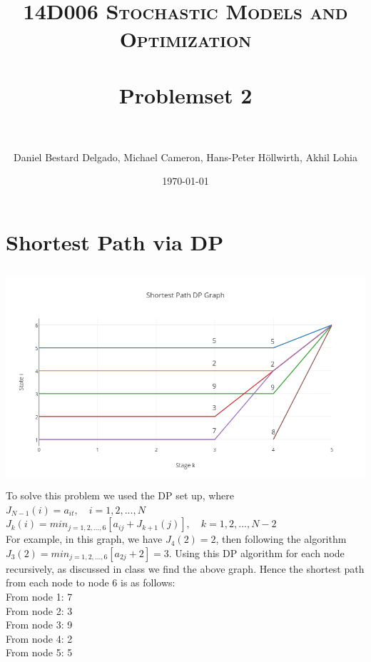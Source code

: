 \documentclass[11pt, oneside]{article}   	%
\title{	
\normalfont \normalsize 
\textsc{14D006 Stochastic Models and Optimization} \\ [25pt] %
\horrule{0.5pt} \\[0.4cm] %
\huge Problemset 2\\ %
\horrule{2pt} \\[0.5cm] %
}
\author{Daniel Bestard Delgado, Michael Cameron, Hans-Peter H{\"o}llwirth, Akhil Lohia} %
\date{\normalsize\today} %
\begin{document}
\maketitle


\section{Shortest Path via DP}


\includegraphics[width=14cm, height=8cm]{Plot2.png} \\
To solve this problem we used the DP set up, where \\
$J_{N-1}(i) = a_{it}, \quad i=1,2,...,N$ \\
$J_{k}(i) = min_{j=1,2,...,6}[a_{ij}+J_{k+1}(j)], \quad k=1,2,...,N-2$  \\

\noindent For example, in this graph, we have $J_{4}(2) = 2$, then following the algorithm \\ $J_{3}(2) = min_{j=1,2,...,6}[a_{2j}+2]=3$. Using this DP algorithm for each node recursively, as discussed in class we find the above graph. Hence the shortest path from each node to node 6 is as follows: \\
From node 1: 7 \\
From node 2: 3 \\
From node 3: 9 \\
From node 4: 2 \\
From node 5: 5


\end{document}
